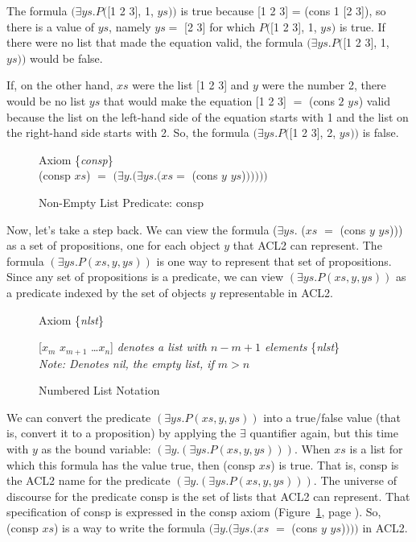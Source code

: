 The formula
$(\exists ys.P($[1 2 3], 1, $ys))$ is true
because [1 2 3] = (cons 1 [2 3]), so there is a value
of $ys$, namely $ys =$ [2 3] for which $P($[1 2 3], 1, $ys)$ is true.
If there were no list that made the equation valid,
the formula $(\exists ys.P($[1 2 3], 1, $ys))$
would be false.

If, on the other hand, $xs$ were the list [1 2 3]
and $y$ were the number 2, there would be no list
$ys$ that would make the equation [1 2 3] $=$ (cons $2$ $ys$) valid
because the list on the left-hand side of the equation
starts with 1 and the list on the right-hand side starts with 2.
So, the formula $(\exists ys.P($[1 2 3], 2, $ys))$
is false.

\begin{figure}
\begin{center}
Axiom \{\emph{consp}\} \\
(consp $xs$) $=$  $(\exists y.(\exists ys.(xs =$ (cons $y$ $ys$)$)))))$
\end{center}
\caption{Non-Empty List Predicate: consp}
\label{consp-axiom}
\end{figure}

Now, let's take a step back.
We can view the formula
($\exists ys.$ ($xs$ $=$ (cons $y$ $ys$)))
as a set of propositions,
one for each object $y$ that ACL2 can represent.
The formula
$(\exists ys.P(xs, y, ys))$ is one way to represent that
set of propositions.
Since any set of propositions is a predicate,
we can view $(\exists ys.P(xs, y, ys))$ as a predicate indexed
by the set of objects $y$ representable in ACL2.

\begin{figure}
\begin{center}
Axiom \{\emph{nlst}\}

[$x_{m}$  $x_{m+1}$ \dots $x_{n}$]  \emph{denotes a list with $n - m + 1$ elements} \{\emph{nlst}\} \\
\emph{Note: Denotes nil, the empty list, if $m > n$}
\end{center}
\caption{Numbered List Notation}
\label{numbered-list-interpretation}
\end{figure}

We can convert the predicate $(\exists ys.P(xs, y, ys))$
into a true/false value (that is, convert it to a proposition)
by applying the $\exists$ quantifier again,
but this time with $y$ as the bound variable:
$(\exists y.(\exists ys.P(xs, y, ys)))$.
When $xs$ is a list for which this formula has the value true,
then (consp $xs$) is true.
That is, consp is the ACL2 name for the predicate $(\exists y.(\exists ys.P(xs, y, ys)))$.
The universe of discourse for the predicate consp is the set of lists that ACL2 can represent.
That specification of consp is expressed in the consp axiom
(Figure~\ref{consp-axiom}, page \pageref{consp-axiom}).
So, (consp $xs$) is a way to write the formula
$(\exists y.(\exists ys.(xs$ $=$ (cons $y$ $ys$)$)))$ in ACL2.

